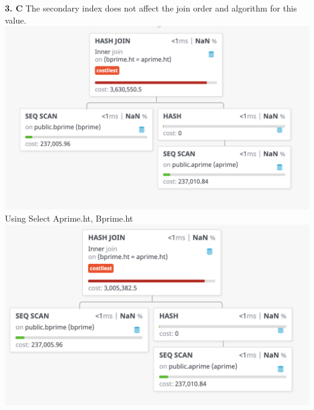 \documentclass[12pt, letterpaper, fleqn]{article}
\begin{document}
  \textbf{3. C}
  The secondary index does not affect the join order and algorithm for this
  value.\\
  \includegraphics[scale=0.5]{query_pics/3.png} \\
  Using Select Aprime.ht, Bprime.ht\\
  \includegraphics[scale=0.5]{query_pics/3b.png} \\\\
\end{document}
